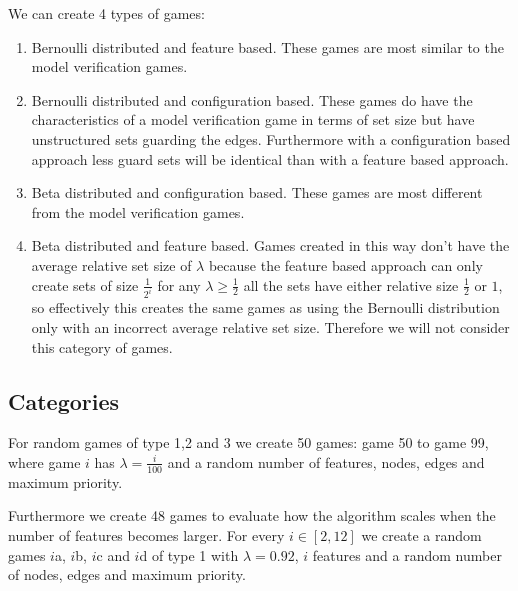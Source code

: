 We can create 4 types of games:
\begin{enumerate}
	\item Bernoulli distributed and feature based. These games are most similar to the model verification games.
	\item Bernoulli distributed and configuration based. These games do have the characteristics of a model verification game in terms of set size but have unstructured sets guarding the edges. Furthermore with a configuration based approach less guard sets will be identical than with a feature based approach.
	\item Beta distributed and configuration based. These games are most different from the model verification games.
	\item Beta distributed and feature based. Games created in this way don't have the average relative set size of $\lambda$ because the feature based approach can only create sets of size $\frac{1}{2^i}$ for any $\lambda \geq \frac{1}{2}$ all the sets have either relative size $\frac{1}{2}$ or $1$, so effectively this creates the same games as using the Bernoulli distribution only with an incorrect average relative set size. Therefore we will not consider this category of games.
\end{enumerate}
\subsection{Categories}
For random games of type 1,2 and 3 we create 50 games: game 50 to game 99, where game $i$ has $\lambda=\frac{i}{100}$ and a random number of features, nodes, edges and maximum priority.

Furthermore we create 48 games to evaluate how the algorithm scales when the number of features becomes larger. For every $i \in [2,12]$ we create a random games $i$a, $i$b, $i$c and $i$d of type 1 with $\lambda=0.92$, $i$ features and a random number of nodes, edges and maximum priority.